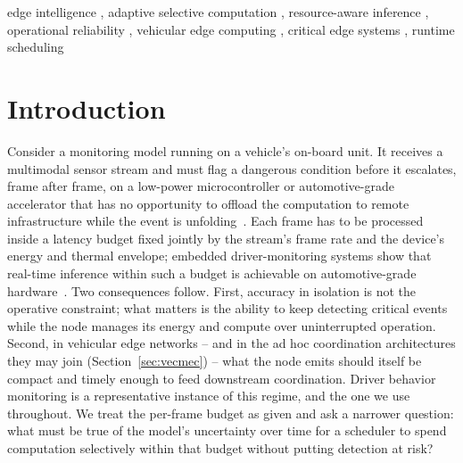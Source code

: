 \documentclass[a4paper,fleqn]{cas-dc}
\renewcommand{\topfraction}{0.95}%
\renewcommand{\bottomfraction}{0.95}%
\renewcommand{\dbltopfraction}{0.95}%
\renewcommand{\textfraction}{0.05}%
\renewcommand{\floatpagefraction}{0.85}%
\renewcommand{\dblfloatpagefraction}{0.85}%
\begin{document}
\begin{keywords}
edge intelligence \sep
adaptive selective computation \sep
resource-aware inference \sep
operational reliability \sep
vehicular edge computing \sep
critical edge systems \sep
runtime scheduling
\end{keywords}
\maketitle
\renewcommand{\topfraction}{0.95}\renewcommand{\bottomfraction}{0.95}%
\renewcommand{\dbltopfraction}{0.95}\renewcommand{\textfraction}{0.05}%
\renewcommand{\floatpagefraction}{0.85}\renewcommand{\dblfloatpagefraction}{0.85}%
\setcounter{topnumber}{5}\setcounter{bottomnumber}{5}%
\setcounter{totalnumber}{8}\setcounter{dbltopnumber}{5}%
\section{Introduction}
\label{sec:introducao}
Consider a monitoring model running on a vehicle's on-board unit. It receives a
multimodal sensor stream and must flag a dangerous condition before it escalates,
frame after frame, on a low-power microcontroller or automotive-grade accelerator
that has no opportunity to offload the computation to remote infrastructure while
the event is unfolding~\cite{bouhsissin2023driver,ortega2020dmd}. Each frame has to
be processed inside a latency budget fixed jointly by the stream's frame rate and
the device's energy and thermal envelope; embedded driver-monitoring systems show
that real-time inference within such a budget is achievable on automotive-grade
hardware~\cite{hariharan2023driveredge,tinydl2025driverstate}. Two consequences
follow. First, accuracy in isolation is not the operative constraint; what
matters is the ability to keep detecting critical events while the node manages
its energy and compute over uninterrupted operation. Second, in vehicular edge networks -- and in the ad hoc coordination
architectures they may join (Section~\ref{sec:vecmec}) -- what the node emits should itself be compact and timely enough to feed
downstream coordination. Driver behavior monitoring is a representative instance of
this regime, and the one we use throughout. We treat the per-frame budget as given
and ask a narrower question: what must be true of the model's uncertainty over time
for a scheduler to spend computation selectively within that budget without putting
detection at risk?
\end{document}
